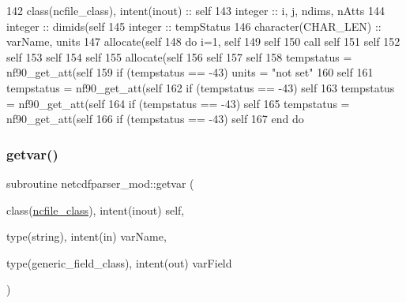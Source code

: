 \begin{DoxyCode}
142     \textcolor{keywordtype}{class}(ncfile\_class), \textcolor{keywordtype}{intent(inout)} :: self
143     \textcolor{keywordtype}{integer} :: i, j, ndims, nAtts
144     \textcolor{keywordtype}{integer} :: dimids(self%
145     \textcolor{keywordtype}{integer} :: tempStatus
146     \textcolor{keywordtype}{character(CHAR\_LEN)} :: varName, units
147     \textcolor{keyword}{allocate}(self%
148     \textcolor{keywordflow}{do} i=1, self%
149         self%
150         \textcolor{keyword}{call }self%
151         self%
152         self%
153         self%
154         self%
155         \textcolor{keyword}{allocate}(self%
156         self%
157         self%
158         tempstatus = nf90\_get\_att(self%
159         \textcolor{keywordflow}{if} (tempstatus == -43) units = \textcolor{stringliteral}{"not set"}
160         self%
161         tempstatus = nf90\_get\_att(self%
162         \textcolor{keywordflow}{if} (tempstatus == -43) self%
163         tempstatus = nf90\_get\_att(self%
164         \textcolor{keywordflow}{if} (tempstatus == -43) self%
165         tempstatus = nf90\_get\_att(self%
166         \textcolor{keywordflow}{if} (tempstatus == -43) self%
167 \textcolor{keywordflow}{    end do}
\end{DoxyCode}
\mbox{\label{namespacenetcdfparser__mod_a1f59a93ed593b1f4670d2c62fa9d5949}} 
\subsubsection{\texorpdfstring{getvar()}{getvar()}}
{\footnotesize\ttfamily subroutine netcdfparser\+\_\+mod\+::getvar (\begin{DoxyParamCaption}\item[{class(\mbox{\hyperlink{structnetcdfparser__mod_1_1ncfile__class}{ncfile\+\_\+class}}), intent(inout)}]{self,  }\item[{type(string), intent(in)}]{var\+Name,  }\item[{type(generic\+\_\+field\+\_\+class), intent(out)}]{var\+Field }\end{DoxyParamCaption})\hspace{0.3cm}{\ttfamily [private]}}



